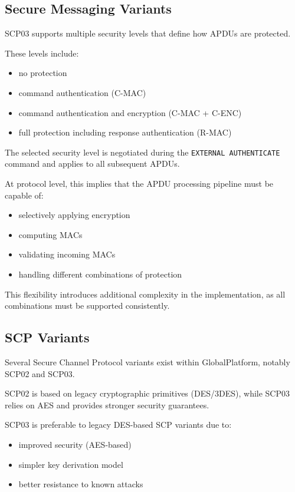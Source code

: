 \subsection{Secure Messaging Variants}

SCP03 supports multiple security levels that define how APDUs are protected.

These levels include:
\begin{itemize}
\item no protection
\item command authentication (C-MAC)
\item command authentication and encryption (C-MAC + C-ENC)
\item full protection including response authentication (R-MAC)
\end{itemize}

The selected security level is negotiated during the 
\texttt{EXTERNAL AUTHENTICATE} command and applies to all subsequent APDUs.

At protocol level, this implies that the APDU processing pipeline must be
capable of:
\begin{itemize}
\item selectively applying encryption
\item computing MACs
\item validating incoming MACs
\item handling different combinations of protection
\end{itemize}

This flexibility introduces additional complexity in the implementation, as all
combinations must be supported consistently.

\subsection{SCP Variants}

Several Secure Channel Protocol variants exist within GlobalPlatform, notably
SCP02 and SCP03.

SCP02 is based on legacy cryptographic primitives (DES/3DES), while SCP03
relies on AES and provides stronger security guarantees.

SCP03 is preferable to legacy DES-based SCP variants due to:
\begin{itemize}
\item improved security (AES-based)
\item simpler key derivation model
\item better resistance to known attacks
\end{itemize}

